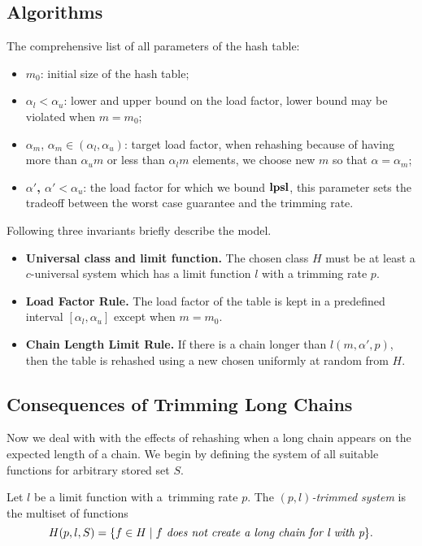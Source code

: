 \subsection{Algorithms}
The comprehensive list of all parameters of the hash table:
\begin{itemize}
	\item {$m_0$}: initial size of the hash table;
	\item {$\alpha_l < \alpha_u$}: lower and upper bound on the load factor, lower bound may be violated when $m = m_0$;
	\item {$\alpha_m$, $\alpha_m \in (\alpha_l, \alpha_u)$}: target load factor, when rehashing because of having more than $\alpha_u m$ or less than $\alpha_l m$ elements, we choose new $m$ so that $\alpha = \alpha_m$;
	\item \textbf{$\alpha'$, $\alpha' < \alpha_u$}: the load factor for which we bound $\mathbf{lpsl}$, this parameter sets the tradeoff between the worst case guarantee and the trimming rate.
\end{itemize}
Following three invariants briefly describe the model. 
\begin{itemize}
\item \textbf{Universal class and limit function.} The chosen class $H$ must be at least a $c$-universal system which has a limit function $l$ with a trimming rate $p$.

\item \textbf{Load Factor Rule.} The load factor of the table is kept in a predefined interval $[\alpha_l, \alpha_u]$ except when $m = m_0$.

\item \textbf{Chain Length Limit Rule.} If there is a chain longer than $l(m, \alpha', p)$, then the table is rehashed using a new chosen uniformly at random from $H$.
\end{itemize}



\subsection{Consequences of Trimming Long Chains}
Now we deal with with the effects of rehashing when a long chain appears on the expected length of a chain.
We begin by defining the system of all suitable functions for arbitrary stored set $S$.
\begin{definition}
\label{definition-trimmed-system}
Let $l$ be a limit function with a~trimming rate $p$. The \emph{$(p, l)$-trimmed system} is the multiset of functions \[ H(p, l, S) = \{ f \in H \mid f \textit{ does not create a long chain for l with p} \}. \]
\end{definition}

